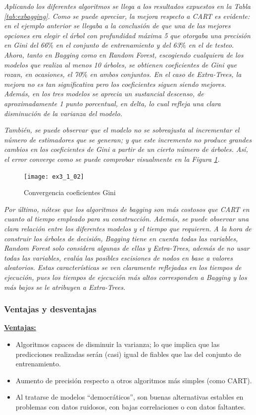 \documentclass[12pt,twoside]{article}
\begin{document}
\emph{Aplicando los diferentes algoritmos se llega a los resultados expuestos en la Tabla \ref{tab:exbagging}. Como se puede apreciar, la mejora respecto a CART es evidente: en el ejemplo anterior se llegaba a la conclusión de que una de las mejores opciones era elegir el árbol con profundidad máxima 5 que otorgaba una precisión en Gini del 66$\%$ en el conjunto de entrenamiento y del 63$\%$ en el de testeo. Ahora, tanto en Bagging como en Random Forest, escogiendo cualquiera de los modelos que realiza al menos 10 árboles, se obtienen coeficientes de Gini que rozan, en ocasiones, el 70$\%$ en ambos conjuntos. En el caso de Extra-Trees, la mejora no es tan significativa pero los coeficientes siguen siendo mejores. Además, en los tres modelos se aprecia un sustancial descenso, de aproximadamente 1 punto porcentual, en delta, lo cual refleja una clara disminución de la varianza del modelo. }

\emph{También, se puede observar que el modelo no se sobreajusta al incrementar el número de estimadores que se generan; y que este incremento no produce grandes cambios en los coeficientes de Gini a partir de un cierto número de árboles. Así, el error converge como se puede comprobar visualmente en la Figura \ref{fig:exbagging}.}

\begin{figure}[h]
\centering
\texttt{[image: ex3\_1\_02]}
\caption{Convergencia coeficientes Gini}
\label{fig:exbagging}
\end{figure}

\emph{Por último, nótese que los algoritmos de bagging son más costosos que CART en cuanto al tiempo empleado para su construcción. Además, se puede observar una clara relación entre los diferentes modelos y el tiempo que requieren. A la hora de construir los árboles de decisión, Bagging tiene en cuenta todas las variables, Random Forest solo considera algunas de ellas y Extra-Trees, además de no usar todas las variables, evalúa las posibles escisiones de nodos en base a valores aleatorios. Estas características se ven claramente reflejadas en los tiempos de ejecución, pues los tiempos de ejecución más altos corresponden a Bagging y los más bajos se le atribuyen a Extra-Trees.}


\subsubsection{Ventajas y desventajas}
\textbf{\underline{Ventajas:}}
\begin{itemize}
\item  Algoritmos capaces de disminuir la varianza; lo que implica que las predicciones realizadas serán (casi) igual de fiables que las del conjunto de entrenamiento.
\item Aumento de precisión respecto a otros algoritmos más simples (como CART).
\item Al tratarse de modelos ``democráticos'', son buenas alternativas estables en problemas con datos ruidosos, con bajas correlaciones o con datos faltantes.
\end{itemize}
\end{document}
